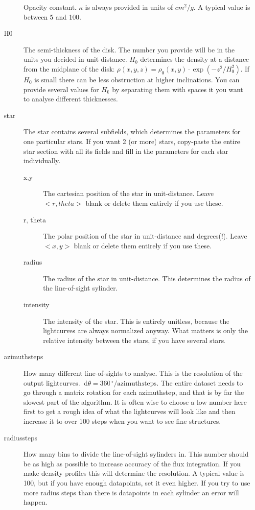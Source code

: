 \documentclass[a4paper, 12pt, english, titlepage]{article}
\newcommand{\D}[1]{\ \mathrm{d}#1} %
\newcommand{\degree}{\, ^\circ}    %
\begin{document}
\begin{description}
            Opacity constant. $\kappa$ is always provided in units of $cm^2 / g$. A typical value is between 5 and 100.
        \item[H0]
            The semi-thickness of the disk. The number you provide will be in the units you decided in unit-distance. $H_0$ determines the density at a distance from the midplane of the disk: 
            $\rho(x, y, z) = \rho_0(x, y) \cdot \exp\left(- z^2 / H_0^2\right)$.
            If $H_0$ is small there can be less obstruction at higher inclinations.
            You can provide several values for $H_0$ by separating them with spaces it you want to analyse different thicknesses.
        \item[star]
            The star contains several subfields, which determines the parameters for one particular stars. If you want 2 (or more) stars, copy-paste the entire star section with all its fields and fill in the parameters for each star individually.
            \begin{description}
                \item[x,y]
                    The cartesian position of the star in unit-distance.
                    Leave $<r,theta>$ blank or delete them entirely if you use these.
                \item[r, theta]
                    The polar position of the star in unit-distance and degrees(!).
                    Leave $<x,y>$ blank or delete them entirely if you use these.
                \item[radius]
                    The radius of the star in unit-distance. This determines the radius of the line-of-sight sylinder.
                \item[intensity]
                    The intensity of the star. This is entirely unitless, because the lightcurves are always normalized anyway. What matters is only the relative intensity between the stars, if you have several stars.
            \end{description}

        \item[azimuthsteps]
            How many different line-of-sights to analyse. This is the resolution of the output lightcurves. $\D \theta = 360\degree / \textrm{azimuthsteps}$. The entire dataset needs to go through a matrix rotation for each azimuthstep, and that is by far the slowest part of the algorithm. It is often wise to choose a low number here first to get a rough idea of what the lightcurves will look like and then increase it to over 100 steps when you want to see fine structures.
        \item[radiussteps]
            How many bins to divide the line-of-sight sylinders in. This number should be as high as possible to increase accuracy of the flux integration. If you make density profiles this will determine the resolution. A typical value is 100, but if you have enough datapoints, set it even higher. If you try to use more radius steps than there is datapoints in each sylinder an error will happen.
    \end{description}
\end{document}

